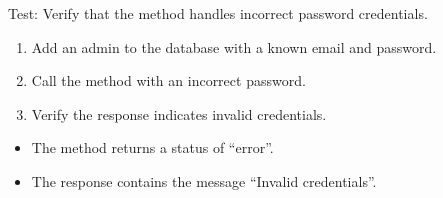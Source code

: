 \documentclass[letterpaper,10pt,english]{sphinxmanual}
\begin{document}
\begin{fulllineitems}
\label{\detokenize{test:test.test_admin.test_login_admin_invalid_password}}
\pysigstartsignatures
\pysiglinewithargsret
{}
{}
{}
\pysigstopsignatures
\sphinxAtStartPar
Test: Verify that the method handles incorrect password credentials.
\begin{description}
\begin{enumerate}
%
\item {} 
\sphinxAtStartPar
Add an admin to the database with a known email and password.

\item {} 
\sphinxAtStartPar
Call the  method with an incorrect password.

\item {} 
\sphinxAtStartPar
Verify the response indicates invalid credentials.

\end{enumerate}

\begin{itemize}
\item {} 
\sphinxAtStartPar
The method returns a status of “error”.

\item {} 
\sphinxAtStartPar
The response contains the message “Invalid credentials”.

\end{itemize}

\end{description}

\end{fulllineitems}

\end{document}
